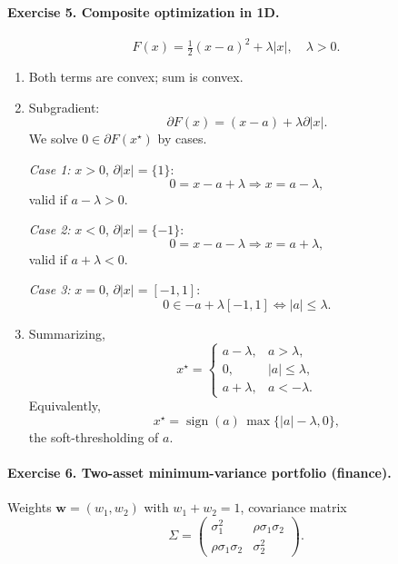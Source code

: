 \documentclass[11pt]{article}
\begin{document}
\bigskip

\paragraph{Exercise 5. Composite optimization in 1D.}

\[
F(x)=\tfrac12(x-a)^2+\lambda |x|,\quad \lambda>0.
\]

\begin{enumerate}
\item Both terms are convex; sum is convex.

\item Subgradient:
\[
\partial F(x) = (x-a) + \lambda \partial |x|.
\]
We solve $0\in\partial F(x^\star)$ by cases.

\emph{Case 1:} $x>0$, $\partial|x|=\{1\}$:
\[
0 = x-a+\lambda \Rightarrow x=a-\lambda,
\]
valid if $a-\lambda>0$.

\emph{Case 2:} $x<0$, $\partial|x|=\{-1\}$:
\[
0 = x-a-\lambda \Rightarrow x=a+\lambda,
\]
valid if $a+\lambda<0$.

\emph{Case 3:} $x=0$, $\partial|x|=[-1,1]$:
\[
0\in -a+\lambda[-1,1]
\Longleftrightarrow |a|\le\lambda.
\]

\item Summarizing,
\[
x^\star =
\begin{cases}
a-\lambda, & a>\lambda,\\[4pt]
0, & |a|\le\lambda,\\[4pt]
a+\lambda, & a<-\lambda.
\end{cases}
\]
Equivalently,
\[
x^\star = \operatorname{sign}(a)\,\max\{|a|-\lambda,0\},
\]
the soft-thresholding of $a$.
\end{enumerate}

\bigskip

\paragraph{Exercise 6. Two-asset minimum-variance portfolio (finance).}

Weights $\bm{w}=(w_1,w_2)$ with $w_1+w_2=1$, covariance matrix
\[
\Sigma=
\begin{pmatrix}
\sigma_1^2 & \rho\sigma_1\sigma_2\\
\rho\sigma_1\sigma_2 & \sigma_2^2
\end{pmatrix}.
\]
\end{document}
